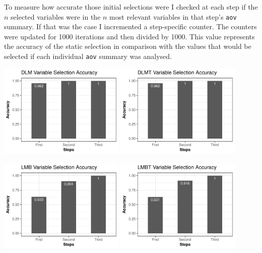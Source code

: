 \documentclass[final,12pt,a4paper]{article}
\begin{document}
To measure how accurate those initial selections were I checked at each step if
the \(n\) selected variables were in the \(n\) most relevant variables in that
step's \texttt{aov} summary. If that was the case I incremented a step-specific
counter. The counters were updated for 1000 iterations and then divided by 1000.
This value represents the accuracy of the static selection in comparison with
the values that would be selected if each individual \texttt{aov} summary was analysed.

\begin{center}
\includegraphics[width=0.45\textwidth]{../img/doptaov_accuracy.pdf}
\includegraphics[width=0.45\textwidth]{../img/dlmt_accuracy.pdf}
\end{center}

\begin{center}
\includegraphics[width=0.45\textwidth]{../img/lmbm_accuracy.pdf}
\includegraphics[width=0.45\textwidth]{../img/lmbmt_accuracy.pdf}
\end{center}
\end{document}
